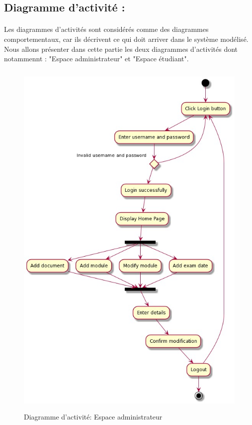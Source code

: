 \documentclass{article}
\begin{document}
{\subsection{Diagramme d'activité :}
\onehalfspacing\paragraph{}{Les diagrammes d’activités sont considérés comme des diagrammes comportementaux, car ils décrivent ce qui doit arriver dans le système modélisé. Nous allons présenter dans cette partie les deux diagrammes d'activités dont notammennt : "Espace administrateur" et "Espace étudiant".}
\begin{figure}[H]
\vspace{2cm}
    \center
    \includegraphics[width=16cm,height=18cm]{small.jpeg}
    \caption{Diagramme d'activité: Espace administrateur}
    \label{fig:Diagramme de séquaneces: Ajouter un module.}
\end{figure}
\begin{figure}[H]


\end{figure}}
\end{document}
